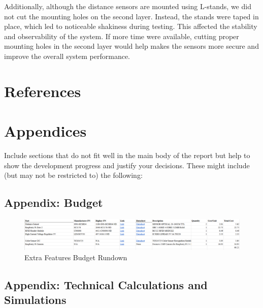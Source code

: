 \documentclass{article}
\begin{document}
Additionally, although the distance sensors are mounted using L-stands, we did
not cut the mounting holes on the second layer. Instead, the stands were
taped in place, which led to noticeable shakiness during testing. This affected
the stability and observability of the system. If more time were available,
cutting proper mounting holes in the second layer would help makes the sensors
more secure and improve the overall system performance.

\section{References}
\printbibliography[heading=none]


\section{Appendices}
Include sections that do not fit well in the main body of the report but help to show the development progress and justify your decisions. These might include (but may not be restricted to) the following:

\subsection{Appendix: Budget}

\begin{figure}[H]
    \centering
    \includegraphics[width=1\textwidth]{Figures/financials.png}
    \caption{Extra Features Budget Rundown}
    \label{fig:financials}
\end{figure}

\subsection{Appendix: Technical Calculations and Simulations}
\end{document}
